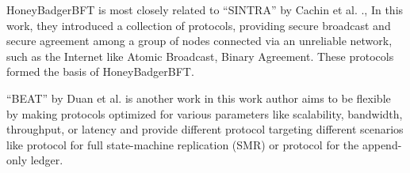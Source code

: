 HoneyBadgerBFT is most closely related to ``SINTRA'' by Cachin et al. .\cite{cachin2002secure}, In this work, they introduced a collection of protocols, providing secure broadcast and secure agreement among a group of nodes connected via an unreliable network, such as the Internet like Atomic Broadcast, Binary Agreement. These protocols formed the basis of HoneyBadgerBFT.

``BEAT'' by Duan et al. \cite{duan2018beat}\cite{morning_paper_beat} is another work in this work author aims to be flexible by making protocols optimized for various parameters like scalability, bandwidth, throughput, or latency and provide different protocol targeting different scenarios like protocol for full state-machine replication (SMR) or protocol for the append-only ledger.


